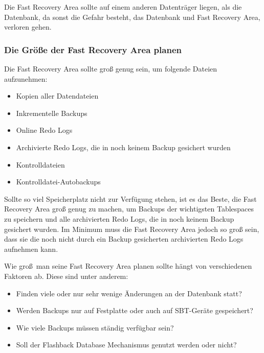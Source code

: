           Die Fast Recovery Area sollte auf einem anderen Datentr\"ager liegen, als die Datenbank, da sonst die Gefahr besteht, das Datenbank und Fast Recovery Area, verloren gehen.
        \subsubsection{Die Gr\"o\ss{}e der Fast Recovery Area planen}
          Die Fast Recovery Area sollte gro\ss{} genug sein, um folgende Dateien aufzunehmen:
          \begin{itemize}
            \item Kopien aller Datendateien
            \item Inkrementelle Backups
            \item Online Redo Logs
            \item Archivierte Redo Logs, die in noch keinem Backup gesichert wurden
            \item Kontrolldateien
            \item Kontrolldatei-Autobackups
          \end{itemize}
          Sollte so viel Speicherplatz nicht zur Verf\"ugung stehen, ist es das Beste, die Fast Recovery Area gro\ss{} genug zu machen, um Backups der wichtigsten Tablespaces zu speichern und alle archivierten Redo Logs, die in noch keinem Backup gesichert wurden. Im Minimum muss die Fast Recovery Area jedoch so gro\ss{} sein, dass sie die noch nicht durch ein Backup gesicherten archivierten Redo Logs aufnehmen kann.

          \begin{merke}
            Wie gro\ss{}\ man seine Fast Recovery Area planen sollte h\"angt von verschiedenen Faktoren ab. Diese sind unter anderem:
            \begin{itemize}
              \item Finden viele oder nur sehr wenige \"Anderungen an der Datenbank statt?
              \item Werden Backups nur auf Festplatte oder auch auf SBT-Ger\"ate gespeichert?
              \item Wie viele Backups m\"ussen st\"andig verf\"ugbar sein?
              \item Soll der Flashback Database Mechanismus genutzt werden oder nicht?
            \end{itemize}
          \end{merke}
